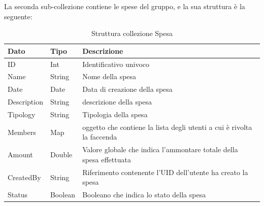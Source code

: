 \newpage
La seconda sub-collezione contiene le spese del gruppo, e la sua struttura è la seguente:
\begin{table}[!h]
\begin{center}
\begin{tabular}{|l|l|p{10cm}|}
    \hline
\textbf{Dato} & \textbf{Tipo}  & \textbf{Descrizione}\\ \hline
ID & Int & Identificativo univoco \\ \hline
Name & String & Nome della spesa \\ \hline
Date & Date & Data di creazione della spesa \\ \hline
Description & String & descrizione della spesa \\ \hline
Tipology & String & Tipologia della spesa \\ \hline
Members & Map & oggetto che contiene la lista degli utenti a cui è rivolta la faccenda \\ \hline
Amount & Double & Valore globale che indica l'ammontare totale della spesa effettuata \\ \hline
CreatedBy & String &  Riferimento contenente l'UID dell'utente ha creato la spesa \\ \hline
Status & Boolean & Booleano che indica lo stato della spesa\\
\hline
\end{tabular}
\caption[Collezione Spesa]{Struttura collezione Spesa}\label{tab:Strutture collezione Spesa}
\end{center}
\end{table}

